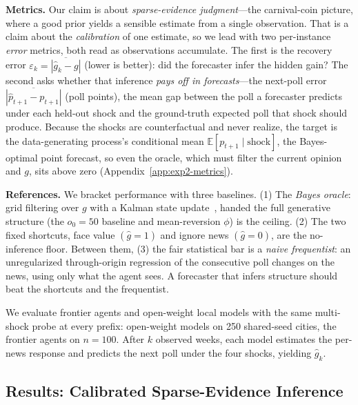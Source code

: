 \documentclass{article} %
\begin{document}
\textbf{Metrics.} Our claim is about \emph{sparse-evidence judgment}---the carnival-coin picture, where a good prior yields a sensible estimate from a single observation. That is a claim about the \emph{calibration} of one estimate, so we lead with two per-instance \emph{error} metrics, both read as observations accumulate. The first is the recovery error \(\varepsilon_k=\overline{|\hat g_k-g|}\) (lower is better): did the forecaster infer the hidden gain? The second asks whether that inference \emph{pays off in forecasts}---the next-poll error \(\overline{|\hat p_{t+1}-p_{t+1}|}\) (poll points), the mean gap between the poll a forecaster predicts under each held-out shock and the ground-truth expected poll that shock should produce. Because the shocks are counterfactual and never realize, the target is the data-generating process's conditional mean \(\mathbb{E}[p_{t+1}\mid\text{shock}]\), the Bayes-optimal point forecast, so even the oracle, which must filter the current opinion and \(g\), sits above zero (Appendix~\ref{app:exp2-metrics}).

\textbf{References.} We bracket performance with three  baselines. (1) The \emph{Bayes oracle}: grid filtering over \(g\) with a Kalman state update~\citep{kalman1960new}, handed the full generative structure (the \(o_0{=}50\) baseline and mean-reversion \(\phi\)) is the ceiling. (2) The two fixed shortcuts, face value \((\hat g{=}1)\) and ignore news \((\hat g{=}0)\), are the no-inference floor. Between them, (3) the fair statistical bar is a \emph{naive frequentist}: an unregularized through-origin regression of the consecutive poll changes on the news, using only what the agent sees. A forecaster that infers structure should beat the shortcuts and the frequentist.



We evaluate frontier agents and open-weight local models with the same multi-shock probe at every prefix: open-weight models on 250 shared-seed cities, the frontier agents on \(n{=}100\). After \(k\) observed weeks, each model estimates the per-news response and predicts the next poll under the four shocks, yielding \(\hat g_k\).


\subsection{Results: Calibrated Sparse-Evidence Inference}
\label{sec:exp2-results}
\end{document}
